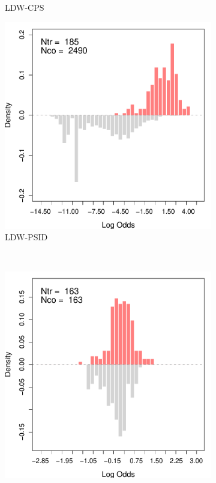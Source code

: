 \documentclass[letterpaper,12pt,leqno]{article}
\begin{document}
\begin{figure}[!th]
\begin{minipage}[c]{.65\textwidth}
\begin{subfigure}{0.45\linewidth}
            \caption{LDW-CPS}
        \end{subfigure}
        \begin{subfigure}{0.45\linewidth}
            \includegraphics[width=\linewidth]{odds_ldw_psid.pdf}
            \caption{LDW-PSID}
        \end{subfigure}\\
        \begin{subfigure}{0.45\linewidth}
            \includegraphics[width=\linewidth]{odds_ldw_cps_trim.pdf}

\end{subfigure}
\end{minipage}
\end{figure}
\end{document}
